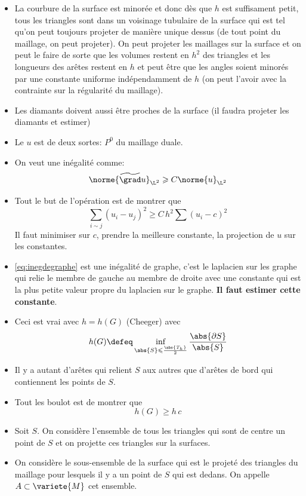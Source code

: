 {\color{blue}
\begin{itemize}
    \item La courbure de la surface est minorée et donc dès que $h$ est suffisament petit, tous les triangles sont dans un voisinage tubulaire de la surface qui est tel qu'on peut toujours projeter de manière unique dessus (de tout point du maillage, on peut projeter). On peut projeter les maillages sur la surface et on peut le faire de sorte que les volumes restent en $h^2$ des triangles et les longueurs des arêtes restent en $h$ et peut être que les angles soient minorés par une constante uniforme indépendamment de $h$ (on peut l'avoir avec la contrainte sur la régularité du maillage).
    \item Les diamants doivent aussi être proches de la surface (il faudra projeter les diamants et estimer)
    \item Le $u$ est de deux sortes: $P^0$ du maillage duale. 
    \item On veut une inégalité comme:
    \[
    \norme{\widetilde{\grad} u}_{\L^2} \geqslant C \norme{u}_{\L^2}
    \]
    \item Tout le but de l'opération est de montrer que
    \begin{equation}\label{eq:inegdegraphe}
    \boxed{
    \sum_{i \sim j} (u_i - u_j)^2 \geqslant C \, h^2 \sum (u_i - c)^2
    }
    \end{equation}
    Il faut minimiser sur $c$, prendre la meilleure constante, la projection de $u$ sur les constantes.
    \item \ref{eq:inegdegraphe} est une inégalité de graphe, c'est le laplacien sur les graphe qui relie le membre de gauche au membre de droite avec une constante qui est la plus petite valeur propre du laplacien sur le graphe. \textbf{Il faut estimer cette constante}. 
    \item Ceci est vrai avec $h = h(G)$ (Cheeger) avec
    \[
    h(G) \defeq \inf_{\abs{S} \leqslant \frac{\abs{T_h}}{2}} \frac{\abs{\partial S}}{\abs{S}}
    \]
    \item Il y a autant d'arêtes qui relient $S$ aux autres que d'arêtes de bord qui contiennent les points de $S$.
    \item Tout les boulot est de montrer que 
    \[
    h(G) \geqslant h \, c
    \] 
    \item Soit $S$. On considère l'ensemble de tous les triangles qui sont de centre un point de $S$ et on projette ces triangles sur la surfaces. 
    \item On considère le sous-ensemble de la surface qui est le projeté des triangles du maillage pour lesquels il y a un point de $S$ qui est dedans. On appelle $A \subset \variete{M}$ cet ensemble. 

\end{itemize}}

